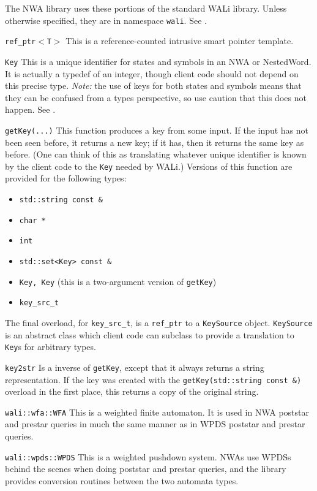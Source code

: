The NWA library uses these portions of the standard WALi library. Unless
otherwise specified, they are in namespace \texttt{wali}. See \cite{wali}.

\begin{description}
  \item\texttt{ref\_ptr$<$T$>$} This is a reference-counted intrusive smart
    pointer template.
  \item\texttt{Key} This is a unique identifier for states and symbols in an
    NWA or NestedWord. It is actually a typedef of an integer, though client
    code should not depend on this precise type. \textsl{Note:} the use of keys for both
    states and symbols means that they can be confused from a types
    perspective, so use caution that this does not happen. See \cite{wali}.
  \item\texttt{getKey(...)} This function produces a key from some input. If
    the input has not been seen before, it returns a new key; if it has, then
    it returns the same key as before. (One can think of this as translating
    whatever unique identifier is known by the client code to the
    \texttt{Key} needed by WALi.) Versions of this function are provided for
    the following types:
    \begin{itemize}
      \item \texttt{std::string const \&}
      \item \texttt{char *}
      \item \texttt{int}
      \item \texttt{std::set<Key> const \&}
      \item \texttt{Key, Key} (this is a two-argument version of
        \texttt{getKey})
      \item \texttt{key\_src\_t}
    \end{itemize}

    The final overload, for \texttt{key\_src\_t}, is a \texttt{ref\_ptr} to a
    \texttt{KeySource} object. \texttt{KeySource} is an abstract class which
    client code can subclass to provide a translation to \texttt{Key}s for
    arbitrary types.
  \item\texttt{key2str} Is a inverse of \texttt{getKey}, except that it
    always returns a string representation. If the key was created with the
    \texttt{getKey(std::string const \&)} overload in the first place, this
    returns a copy of the original string.
  \item\texttt{wali::wfa::WFA} This is a weighted finite automaton. It is
    used in NWA poststar and prestar queries in much the same manner as in
    WPDS poststar and prestar queries.
  \item\texttt{wali::wpds::WPDS} This is a weighted pushdown system. NWAs use
    WPDSs behind the scenes when doing poststar and prestar queries, and the
    library provides conversion routines between the two automata types.
\end{description}


